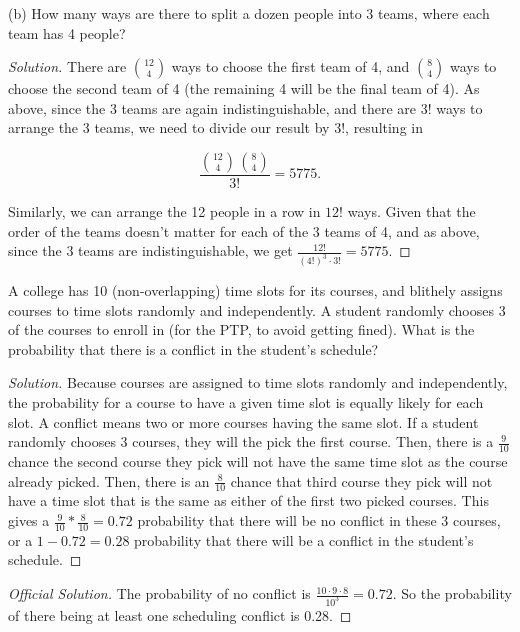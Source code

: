 \documentclass[10pt]{article}
\newenvironment{problem}[2][Problem]{\begin{trivlist}
\item[\hskip \labelsep {\bfseries #1}\hskip \labelsep {\bfseries #2.}]}{\end{trivlist}}
\begin{document}
(b) How many ways are there to split a dozen people into 3 teams, where each team has 4 people?
\begin{proof}[Solution]


There are \(\binom{12}{4}\) ways to choose the first team of 4, and \(\binom{8}{4}\) ways to choose the second team of 4 (the remaining 4 will be the final team of 4). As above, since the 3 teams are again indistinguishable, and there are $3!$ ways to arrange the 3 teams, we need to divide our result by $3!$, resulting in 

\[
\frac{\binom{12}{4} \, \binom{8}{4}}{3!} = 5775.
\]

Similarly, we can arrange the 12 people in a row in $12!$ ways.  Given that the order of the teams doesn't matter for each of the 3 teams of 4, and as above, since the 3 teams are indistinguishable, we get \(\frac{12!}{(4!)^3 \cdot 3!} = 5775\).

\end{proof}


\begin{problem}{3} 
A college has 10 (non-overlapping) time slots for its courses, and blithely assigns courses to time slots randomly and independently. A student randomly chooses 3 of the courses to enroll in (for the PTP, to avoid getting fined). What is the probability that there is a conflict in the student's schedule?
\end{problem}

\begin{proof}[Solution]

Because courses are assigned to time slots randomly and independently, the probability for a course to have a given time slot is equally likely for each slot. A conflict means two or more courses having the same slot. If a student randomly chooses 3 courses, they will the pick the first course. Then, there is a \(\frac{9}{10}\) chance the second course they pick will not have the same time slot as the course already picked. Then, there is an \(\frac{8}{10}\) chance that third course they pick will not have a time slot that is the same as either of the first two picked courses. This gives a \(\frac{9}{10} * \frac{8}{10} = 0.72\) probability that there will be no conflict in these 3 courses, or a $1 - 0.72 = 0.28$ probability that there will be a conflict in the student's schedule.

\end{proof}

\begin{proof}[Official Solution]
The probability of no conflict is $\frac{10 \cdot 9 \cdot 8}{10^3} = 0.72$. So the probability of there being at least one scheduling conflict is 0.28.
\end{proof}
\end{document}
